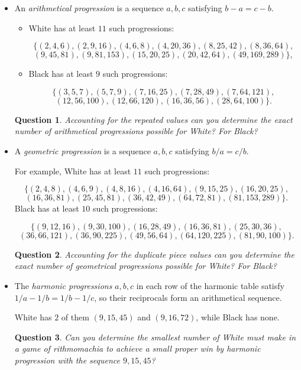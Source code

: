 \documentclass[14pt]{extarticle}
\newtheorem{question}{Question}
\begin{document}
\begin{itemize}
\item
An {\it arithmetical progression} is a sequence $a,b,c$ satisfying $b-a=c-b$.

\begin{itemize}
\item
 White has at least $11$ such progressions:

{\small{
\[
\{(2, 4, 6), (2, 9, 16), (4, 6, 8), (4, 20, 36), (8, 25, 42), (8, 36, 64),
\]
\[
(9, 45, 81), (9, 81, 153), (15, 20, 25), (20, 42, 64), (49, 169, 289)\},
\]
}}
\item
Black has at least $9$ such progressions:

\[
\{(3, 5, 7), (5, 7, 9), (7, 16, 25), (7, 28, 49), (7, 64, 121),
\]
\[
(12, 56, 100), (12, 66, 120), (16, 36, 56), (28, 64, 100)
\}.
\]
\end{itemize}


\begin{question}
Accounting for the repeated values can you determine the
{\it exact} number of arithmetical progressions possible for
White? For Black?
\end{question}

\item
A {\it geometric progression} is a sequence $a,b,c$ 
satisfying $b/a=c/b$.

For example, White has at least $11$ such progressions:

\[
\{
(2, 4, 8), (4, 6, 9), (4, 8, 16), (4, 16, 64), (9, 15, 25), (16, 20, 25),
\]
\[
 (16, 36, 81), (25, 45, 81), (36, 42, 49), (64, 72, 81), (81, 153, 289)
\}.
\]
Black has at least $10$ such progressions:

\[
\{
(9, 12, 16), (9, 30, 100), (16, 28, 49), (16, 36, 81), (25, 30, 36),
\]
\[
(36, 66, 121), (36, 90, 225), (49, 56, 64), (64, 120, 225), (81, 90, 100)
\}.
\]

\begin{question}
Accounting for the duplicate piece values can you determine the
{\it exact} number of geometrical progressions possible for
White? For Black?
\end{question}

\item
The {\it harmonic progressions} $a,b,c$ in each row of the harmonic table
satisfy $1/a - 1/b = 1/b - 1/c$, so their reciprocals form an
arithmetical sequence.

White has $2$ of them $(9, 15, 45)$ and $(9, 16, 72)$,
while Black has none.

\begin{question}
Can you determine the smallest number of White must make in a game
of rithmomachia to achieve a small proper win by harmonic progression
with the
sequence $9,15,45$?
\end{question}
\end{itemize}
\end{document}

